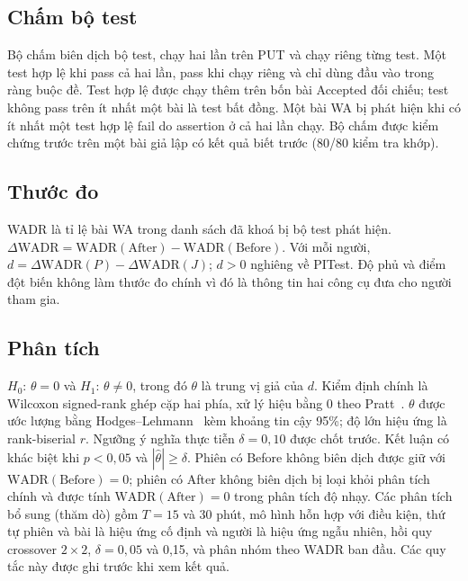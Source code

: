 \subsection{Chấm bộ test}
Bộ chấm biên dịch bộ test, chạy hai lần trên PUT và chạy riêng từng test. Một test hợp lệ khi pass cả hai lần, pass khi chạy riêng và chỉ dùng đầu vào trong ràng buộc đề. Test hợp lệ được chạy thêm trên bốn bài Accepted đối chiếu; test không pass trên ít nhất một bài là test bất đồng. Một bài WA bị phát hiện khi có ít nhất một test hợp lệ fail do assertion ở cả hai lần chạy. Bộ chấm được kiểm chứng trước trên một bài giả lập có kết quả biết trước (80/80 kiểm tra khớp).

\subsection{Thước đo}
WADR là tỉ lệ bài WA trong danh sách đã khoá bị bộ test phát hiện. $\Delta\mathrm{WADR} = \mathrm{WADR(After)} - \mathrm{WADR(Before)}$. Với mỗi người, $d = \Delta\mathrm{WADR}(P) - \Delta\mathrm{WADR}(J)$; $d > 0$ nghiêng về PITest. Độ phủ và điểm đột biến không làm thước đo chính vì đó là thông tin hai công cụ đưa cho người tham gia.

\subsection{Phân tích}
$H_0$: $\theta = 0$ và $H_1$: $\theta \neq 0$, trong đó $\theta$ là trung vị giả của $d$. Kiểm định chính là Wilcoxon signed-rank ghép cặp hai phía, xử lý hiệu bằng 0 theo Pratt~\cite{pratt1959}. $\theta$ được ước lượng bằng Hodges--Lehmann~\cite{hodges1963} kèm khoảng tin cậy 95\%; độ lớn hiệu ứng là rank-biserial $r$. Ngưỡng ý nghĩa thực tiễn $\delta = 0,10$ được chốt trước. Kết luận có khác biệt khi $p < 0,05$ và $|\hat{\theta}| \geq \delta$. Phiên có Before không biên dịch được giữ với $\mathrm{WADR(Before)} = 0$; phiên có After không biên dịch bị loại khỏi phân tích chính và được tính $\mathrm{WADR(After)} = 0$ trong phân tích độ nhạy. Các phân tích bổ sung (thăm dò) gồm $T = 15$ và 30 phút, mô hình hỗn hợp với điều kiện, thứ tự phiên và bài là hiệu ứng cố định và người là hiệu ứng ngẫu nhiên, hồi quy crossover $2\times2$, $\delta = 0,05$ và 0,15, và phân nhóm theo WADR ban đầu. Các quy tắc này được ghi trước khi xem kết quả.
